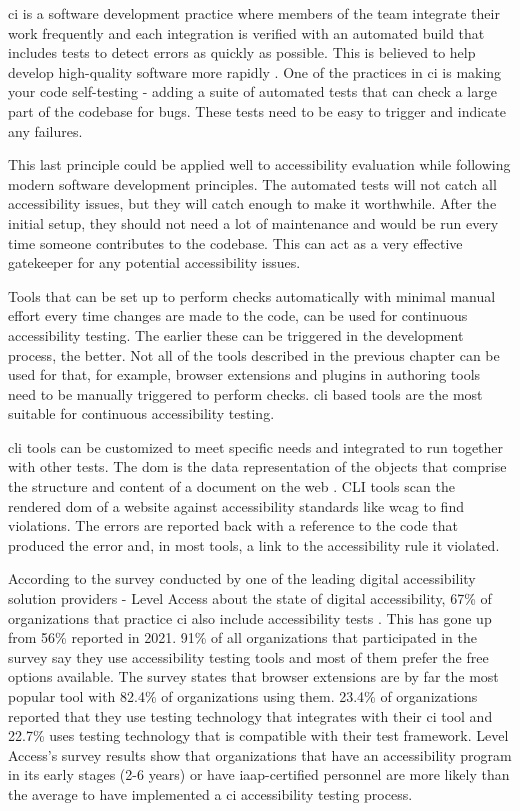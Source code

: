 \documentclass{master_thesis}
\begin{document}
\Ac{ci} is a software development practice where members of the team integrate their work frequently and each integration is verified with an automated build that includes tests to detect errors as quickly as possible. This is believed to help develop high-quality software more rapidly \citep{Fowler2006}. One of the practices in \ac{ci} is making your code self-testing - adding a suite of automated tests that can check a large part of the codebase for bugs. These tests need to be easy to trigger and indicate any failures.

This last principle could be applied well to accessibility evaluation while following modern software development principles. The automated tests will not catch all accessibility issues, but they will catch enough to make it worthwhile. After the initial setup, they should not need a lot of maintenance and would be run every time someone contributes to the codebase. This can act as a very effective gatekeeper for any potential accessibility issues.

Tools that can be set up to perform checks automatically with minimal manual effort every time changes are made to the code, can be used for continuous accessibility testing. The earlier these can be triggered in the development process, the better. Not all of the tools described in the previous chapter can be used for that, for example, browser extensions and plugins in authoring tools need to be manually triggered to perform checks. \ac{cli} based tools are the most suitable for continuous accessibility testing.

\ac{cli} tools can be customized to meet specific needs and integrated to run together with other tests. The \ac{dom} is the data representation of the objects that comprise the structure and content of a document on the web \citep{MDN2023}. CLI tools scan the rendered \ac{dom} of a website against accessibility standards like \ac{wcag} to find violations. The errors are reported back with a reference to the code that produced the error and, in most tools, a link to the accessibility rule it violated.

According to the survey conducted by one of the leading digital accessibility solution providers - Level Access about the state of digital accessibility, 67\% of organizations that practice \ac{ci} also include accessibility tests \citep{LevelAccess}. This has gone up from 56\% reported in 2021. 91\% of all organizations that participated in the survey say they use accessibility testing tools and most of them prefer the free options available. The survey states that browser extensions are by far the most popular tool with 82.4\% of organizations using them. 23.4\% of organizations reported that they use testing technology that integrates with their \ac{ci} tool and 22.7\% uses testing technology that is compatible with their test framework. Level Access's survey results show that organizations that have an accessibility program in its early stages (2-6 years) or have \ac{iaap}-certified personnel are more likely than the average to have implemented a \ac{ci} accessibility testing process.
\end{document}
